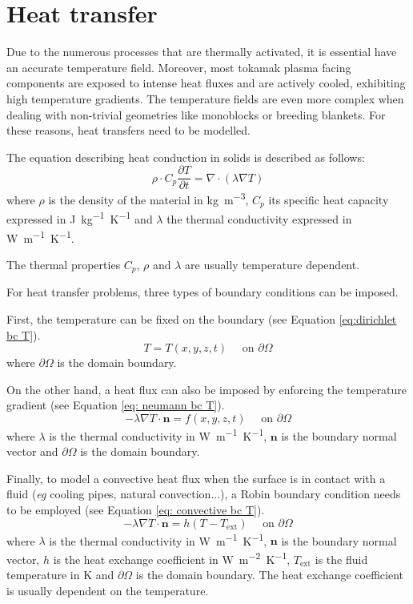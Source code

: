 \section{Heat transfer}
Due to the numerous processes that are thermally activated, it is essential have an accurate temperature field.
Moreover, most tokamak plasma facing components are exposed to intense heat fluxes and are actively cooled, exhibiting high temperature gradients.
The temperature fields are even more complex when dealing with non-trivial geometries like monoblocks or breeding blankets.
For these reasons, heat transfers need to be modelled.

The equation describing heat conduction in solids is described as follows:
\begin{equation}
    \rho \cdot C_p \frac{\partial T}{\partial t}=\nabla \cdot (\lambda \nabla T)
    \label{eq:heat equation}
\end{equation}
where $\rho$ is the density of the material in \si{kg.m^{-3}}, $C_p$ its specific heat capacity expressed in \si{J.kg^{-1}.K^{-1}} and $\lambda$ the thermal conductivity expressed in \si{W.m^{-1}.K^{-1}}.

The thermal properties $C_p$, $\rho$ and $\lambda$ are usually temperature dependent.

For heat transfer problems, three types of boundary conditions can be imposed.

First, the temperature can be fixed on the boundary (see Equation \ref{eq:dirichlet bc T}).
\begin{equation}
    T = T(x, y, z, t) \quad \text { on } \partial \Omega
    \label{eq:dirichlet bc T}
\end{equation}
where $\partial \Omega$ is the domain boundary.

On the other hand, a heat flux can also be imposed by enforcing the temperature gradient (see Equation \ref{eq: neumann bc T}).
\begin{equation}
    -\lambda \nabla T \cdot \mathbf{n} = f(x, y, z, t) \quad \text { on } \partial \Omega
    \label{eq: neumann bc T}
\end{equation}
where $\lambda$ is the thermal conductivity in \si{W.m^{-1}.K^{-1}}, $\mathbf{n}$ is the boundary normal vector and $\partial \Omega$ is the domain boundary.

Finally, to model a convective heat flux when the surface is in contact with a fluid (\textit{eg} cooling pipes, natural convection...), a Robin boundary condition needs to be employed (see Equation \ref{eq: convective bc T}).
\begin{equation}
    -\lambda \nabla T \cdot \mathbf{n} = h (T - T_\mathrm{ext}) \quad \text { on } \partial \Omega
    \label{eq: convective bc T}
\end{equation}
where $\lambda$ is the thermal conductivity in \si{W.m^{-1}.K^{-1}}, $\mathbf{n}$ is the boundary normal vector, $h$ is the heat exchange coefficient in \si{W.m^{-2}.K^{-1}}, $T_\mathrm{ext}$ is the fluid temperature in \si{K} and $\partial \Omega$ is the domain boundary.
The heat exchange coefficient is usually dependent on the temperature.


